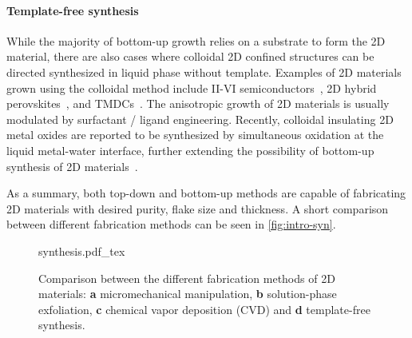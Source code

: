 \paragraph{Template-free synthesis}
While the majority of bottom-up growth relies on a substrate to form
the 2D material, there are also cases where colloidal 2D confined
structures can be directed synthesized in liquid phase without
template. Examples of 2D materials grown using the colloidal method
include II-VI semiconductors~\cite{Riedinger_2017_2D}, 2D hybrid
perovskites~\cite{Jagielski_2017_SA}, and
TMDCs~\citeauthor{Altavilla_2011,Plashnitsa_2012_mos2_wet}. The
anisotropic growth of 2D materials is usually modulated by surfactant
/ ligand
engineering\cite{Riedinger_2017_2D,Jagielski_2017_SA}. Recently,
colloidal insulating 2D metal oxides are reported to be synthesized by
simultaneous oxidation at the liquid metal-water interface, further
extending the possibility of bottom-up synthesis of 2D
materials~\cite{Zavabeti_2017_GaOx}.

As a summary, both top-down and bottom-up methods are capable of
fabricating 2D materials with desired purity, flake size and
thickness. A short comparison between different fabrication methods can be seen in \autoref{fig:intro-syn}.

\begin{figure}[h]
  \centering
  {synthesis.pdf_tex}
  \caption{\label{fig:intro-syn}%
    Comparison between the different fabrication methods of 2D
    materials: \textbf{a} micro\-mechanical manipulation, \textbf{b}
    solution-phase exfoliation, \textbf{c} chemical vapor deposition
    (CVD) and \textbf{d} template-free synthesis.%
  }
\end{figure}



